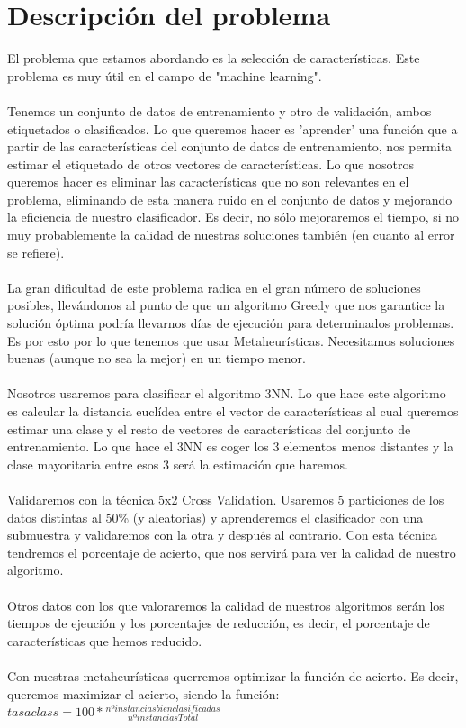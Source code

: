 	\section{Descripción del problema}
	El problema que estamos abordando es la selección de características. Este problema es muy útil en el campo de "machine learning".
	\\
	\\
	Tenemos un conjunto de datos de entrenamiento y otro de validación, ambos etiquetados o clasificados. Lo que queremos hacer es 'aprender' una función que a partir de las características del conjunto de datos de entrenamiento, nos permita estimar el etiquetado de otros vectores de características. Lo que nosotros queremos hacer es eliminar las características que no son relevantes en el problema, eliminando de esta manera ruido en el conjunto de datos y mejorando la eficiencia de nuestro clasificador. Es decir, no sólo mejoraremos el tiempo, si no muy probablemente la calidad de nuestras soluciones también (en cuanto al error se refiere).
	\\
	\\
	La gran dificultad de este problema radica en el gran número de soluciones posibles, llevándonos al punto de que un algoritmo Greedy que nos garantice la solución óptima podría llevarnos días de ejecución para determinados problemas. Es por esto por lo que tenemos que usar Metaheurísticas. Necesitamos soluciones buenas (aunque no sea la mejor) en un tiempo menor.
	\\
	\\
	Nosotros usaremos para clasificar el algoritmo 3NN. Lo que hace este algoritmo es calcular la distancia euclídea entre el vector de características al cual queremos estimar una clase y el resto de vectores de características del conjunto de entrenamiento. Lo que hace el 3NN es coger los 3 elementos menos distantes y la clase mayoritaria entre esos 3 será la estimación que haremos.
	\\
	\\
	Validaremos con la técnica 5x2 Cross Validation. Usaremos 5 particiones de los datos distintas al 50\% (y aleatorias) y aprenderemos el clasificador con una submuestra y validaremos con la otra y después al contrario. Con esta técnica tendremos el porcentaje de acierto, que nos servirá para ver la calidad de nuestro algoritmo.
	\\
	\\
	Otros datos con los que valoraremos la calidad de nuestros algoritmos serán los tiempos de ejeución y los porcentajes de reducción, es decir, el porcentaje de características que hemos reducido.
	\\
	\\
	Con nuestras metaheurísticas querremos optimizar la función de acierto. Es decir, queremos maximizar el acierto, siendo la función:\\
	$tasaclass = 100*\frac{nºinstancias bien clasificadas}{nº instancias Total}$
	

